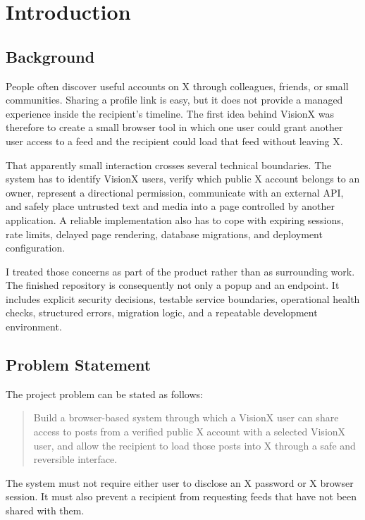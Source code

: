 \documentclass[11pt,a4paper]{report}
\begin{document}
\tableofcontents
\clearpage
{}

\chapter{Introduction}

\section{Background}
People often discover useful accounts on X through colleagues, friends, or
small communities. Sharing a profile link is easy, but it does not provide a
managed experience inside the recipient's timeline. The first idea behind
VisionX was therefore to create a small browser tool in which one user could
grant another user access to a feed and the recipient could load that feed
without leaving X.

That apparently small interaction crosses several technical boundaries. The
system has to identify VisionX users, verify which public X account belongs to
an owner, represent a directional permission, communicate with an external API,
and safely place untrusted text and media into a page controlled by another
application. A reliable implementation also has to cope with expiring sessions,
rate limits, delayed page rendering, database migrations, and deployment
configuration.

I treated those concerns as part of the product rather than as surrounding
work. The finished repository is consequently not only a popup and an endpoint.
It includes explicit security decisions, testable service boundaries,
operational health checks, structured errors, migration logic, and a repeatable
development environment.

\section{Problem Statement}
The project problem can be stated as follows:

\begin{quote}
Build a browser-based system through which a VisionX user can share access to
posts from a verified public X account with a selected VisionX user, and allow
the recipient to load those posts into X through a safe and reversible
interface.
\end{quote}

The system must not require either user to disclose an X password or X browser
session. It must also prevent a recipient from requesting feeds that have not
been shared with them.
\end{document}
